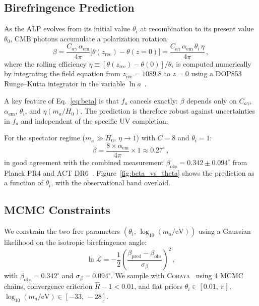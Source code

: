 \subsection{Birefringence Prediction}
\label{sec:beta_prediction}

As the ALP evolves from its initial value $\theta_i$ at recombination to its
present value $\theta_0$, CMB photons accumulate a polarization rotation
%
\begin{equation}
\label{eq:beta}
\beta = \frac{C_{a\gamma}\,\alpha_\mathrm{em}}{4\pi}
        \bigl[\theta(z_\mathrm{rec}) - \theta(z{=}0)\bigr]
      = \frac{C_{a\gamma}\,\alpha_\mathrm{em}\,\theta_i\,\eta}{4\pi} \,,
\end{equation}
%
where the rolling efficiency
$\eta \equiv [\theta(z_\mathrm{rec}) - \theta(0)] / \theta_i$ is computed
numerically by integrating the field equation from $z_\mathrm{rec} = 1089.8$
to $z = 0$ using a DOP853 Runge--Kutta integrator in the variable
$\ln a$~\cite{DOP853}.

A key feature of Eq.~\eqref{eq:beta} is that $f_a$ cancels exactly: $\beta$
depends only on $C_{a\gamma}$, $\alpha_\mathrm{em}$, $\theta_i$, and
$\eta(m_a/H_0)$.  The prediction is therefore robust against
uncertainties in $f_a$ and independent of the specific UV completion.

For the spectator regime ($m_a \gg H_0$, $\eta \to 1$) with $C = 8$ and
$\theta_i = 1$:
%
\begin{equation}
\label{eq:beta_fiducial}
\beta = \frac{8 \times \alpha_\mathrm{em}}{4\pi} \times 1
      \approx 0.27^\circ \,,
\end{equation}
%
in good agreement with the combined measurement $\beta_\mathrm{obs} = 0.342
\pm 0.094^\circ$ from Planck PR4 and ACT
DR6~\cite{Eskilt2022,DiegoPalazuelos2022}.
Figure~\ref{fig:beta_vs_theta} shows the prediction as a function of
$\theta_i$, with the observational band overlaid.


\subsection{MCMC Constraints}
\label{sec:mcmc}

We constrain the two free parameters $(\theta_i,\,\log_{10}(m_a/\mathrm{eV}))$
using a Gaussian likelihood on the isotropic birefringence angle:
%
\begin{equation}
\ln\mathcal{L} = -\frac{1}{2}
  \left(\frac{\beta_\mathrm{pred} - \beta_\mathrm{obs}}{\sigma_\beta}\right)^2 \,,
\end{equation}
%
with $\beta_\mathrm{obs} = 0.342^\circ$ and $\sigma_\beta = 0.094^\circ$.
We sample with \textsc{Cobaya}~\cite{Cobaya} using 4 MCMC chains, convergence
criterion $\hat{R} - 1 < 0.01$, and flat priors $\theta_i \in [0.01,\,\pi]$,
$\log_{10}(m_a/\mathrm{eV}) \in [-33,\,-28]$.

